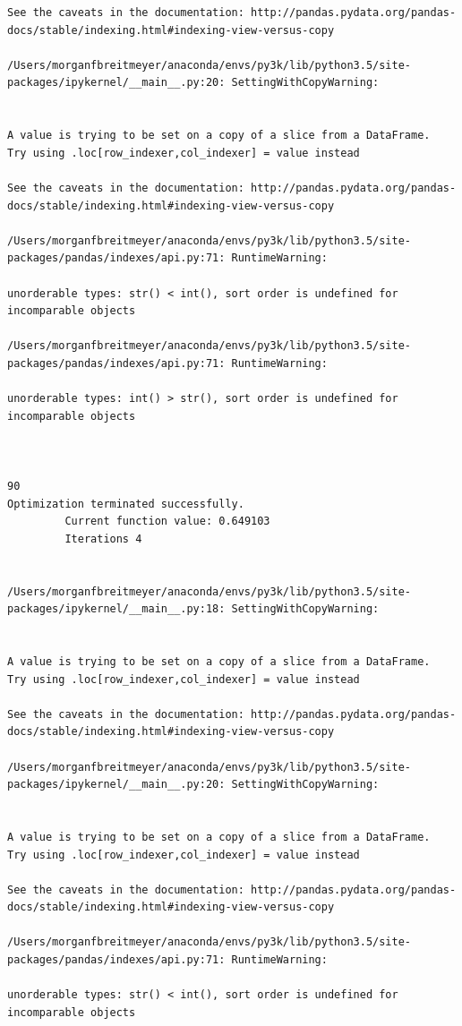 \begin{lstlisting}
See the caveats in the documentation: http://pandas.pydata.org/pandas-docs/stable/indexing.html#indexing-view-versus-copy

/Users/morganfbreitmeyer/anaconda/envs/py3k/lib/python3.5/site-packages/ipykernel/__main__.py:20: SettingWithCopyWarning:


A value is trying to be set on a copy of a slice from a DataFrame.
Try using .loc[row_indexer,col_indexer] = value instead

See the caveats in the documentation: http://pandas.pydata.org/pandas-docs/stable/indexing.html#indexing-view-versus-copy

/Users/morganfbreitmeyer/anaconda/envs/py3k/lib/python3.5/site-packages/pandas/indexes/api.py:71: RuntimeWarning:

unorderable types: str() < int(), sort order is undefined for incomparable objects

/Users/morganfbreitmeyer/anaconda/envs/py3k/lib/python3.5/site-packages/pandas/indexes/api.py:71: RuntimeWarning:

unorderable types: int() > str(), sort order is undefined for incomparable objects



90
Optimization terminated successfully.
         Current function value: 0.649103
         Iterations 4


/Users/morganfbreitmeyer/anaconda/envs/py3k/lib/python3.5/site-packages/ipykernel/__main__.py:18: SettingWithCopyWarning:


A value is trying to be set on a copy of a slice from a DataFrame.
Try using .loc[row_indexer,col_indexer] = value instead

See the caveats in the documentation: http://pandas.pydata.org/pandas-docs/stable/indexing.html#indexing-view-versus-copy

/Users/morganfbreitmeyer/anaconda/envs/py3k/lib/python3.5/site-packages/ipykernel/__main__.py:20: SettingWithCopyWarning:


A value is trying to be set on a copy of a slice from a DataFrame.
Try using .loc[row_indexer,col_indexer] = value instead

See the caveats in the documentation: http://pandas.pydata.org/pandas-docs/stable/indexing.html#indexing-view-versus-copy

/Users/morganfbreitmeyer/anaconda/envs/py3k/lib/python3.5/site-packages/pandas/indexes/api.py:71: RuntimeWarning:

unorderable types: str() < int(), sort order is undefined for incomparable objects


\end{lstlisting}
